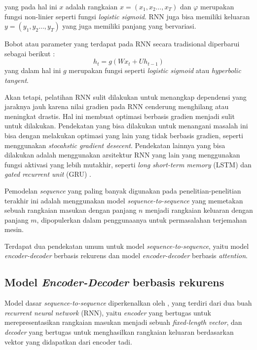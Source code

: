 yang pada hal ini \(x\) adalah rangkaian \(x=(x_{1},x_{2}\dots,x_{T})\) dan \(\varphi\) merupakan fungsi non-linier seperti fungsi \textit{logistic sigmoid}. RNN juga bisa memiliki keluaran \(y=(y_{1},y_{2}\dots,y_{T})\) yang juga memiliki panjang yang bervariasi.
\bigskip

Bobot atau parameter yang terdapat pada RNN secara tradisional diperbarui sebagai berikut \parencite{Chung2014}:
\[
    h_{t} = g(Wx_{t}+Uh_{t-1})
\]
yang dalam hal ini \(g\) merupakan fungsi seperti \textit{logistic sigmoid} atau \textit{hyperbolic tangent}.
\bigskip

Akan tetapi, pelatihan RNN sulit dilakukan untuk menangkap dependensi yang jaraknya jauh karena nilai gradien pada RNN cenderung menghilang atau meningkat drastis. Hal ini membuat optimasi berbasis gradien menjadi sulit untuk dilakukan. Pendekatan yang bisa dilakukan untuk menangani masalah ini bisa dengan melakukan optimasi yang lain yang tidak berbasis gradien, seperti menggunakan \textit{stocahstic gradient desecent}. Pendekatan lainnya yang bisa dilakukan adalah menggunakan arsitektur RNN yang lain yang menggunakan fungsi aktivasi yang lebih mutakhir, seperti \textit{long short-term memory} (LSTM) \parencite{Hochreiter1997} dan \textit{gated recurrent unit} (GRU) \parencite{Cho2014a}.
\bigskip

Pemodelan \textit{sequence} yang paling banyak digunakan pada penelitian-penelitian terakhir ini adalah menggunakan model \textit{sequence-to-sequence} yang memetakan sebuah rangkaian masukan dengan panjang \(n\) menjadi rangkaian keluaran dengan panjang \(m\), dipopulerkan dalam penggunaanya untuk permasalahan terjemahan mesin.
\bigskip

Terdapat dua pendekatan umum untuk model \textit{sequence-to-sequence}, yaitu model \textit{encoder-decoder} berbasis rekurens dan model \textit{encoder-decoder} berbasis \textit{attention}.


\subsection{Model \textit{Encoder-Decoder} berbasis rekurens}

Model dasar \textit{sequence-to-sequence} diperkenalkan oleh \textcite{Cho2014b}, yang terdiri dari dua buah \textit{recurrent neural network} (RNN), yaitu \textit{encoder} yang bertugas untuk merepresentasikan rangkaian masukan menjadi sebuah \textit{fixed-length vector}, dan \textit{decoder} yang bertugas untuk menghasilkan rangkaian keluaran berdasarkan vektor yang didapatkan dari encoder tadi.

